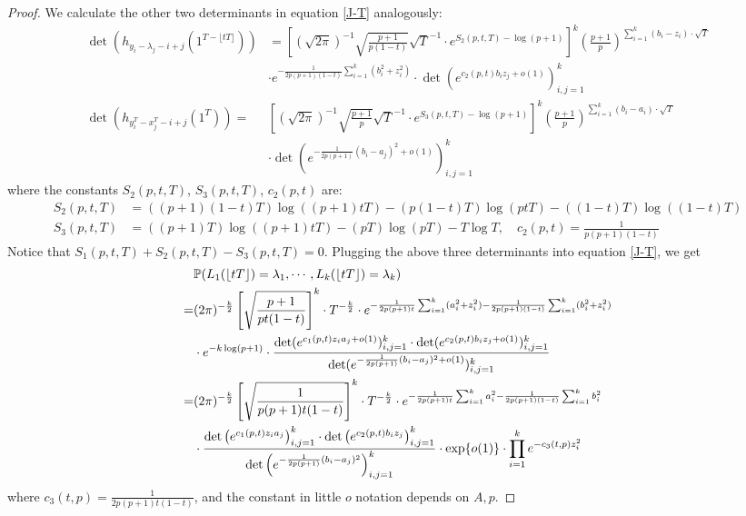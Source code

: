\begin{proof}
We calculate the other two determinants in equation \ref{J-T} analogously:
\begin{align*}
	\det \left(h_{y_{i}-\lambda_{j}-i+j}(1^{T-\lfloor tT \rfloor})\right)&= \left[(\sqrt{2\pi})^{-1}\sqrt{\frac{p+1}{p(1-t)}}\sqrt{T}^{-1}\cdot e^{S_{2}(p,t,T)-\log(p+1)}\right]^{k}\left(\frac{p+1}{p}\right)^{\sum_{i=1}^{k}(b_{i}-z_{i})\cdot\sqrt{T}} \\
	& \cdot e^{-\frac{1}{2p(p+1)(1-t)}\sum_{i=1}^{k}(b_{i}^2+z_{i}^2)}\cdot \det\left(e^{c_{2}(p,t)b_{i}z_{j}+o(1)}\right)_{i,j=1}^{k}\\
	\det(h_{y_{i}^{T}-x_{j}^{T}-i+j}(1^{T}))=& \left[(\sqrt{2\pi})^{-1}\sqrt{\frac{p+1}{p}}\sqrt{T}^{-1}\cdot e^{S_{3}(p,t,T)-\log(p+1)}\right]^{k}\left(\frac{p+1}{p}\right)^{\sum_{i=1}^{k}(b_{i}-a_{i})\cdot\sqrt{T}} \\
	&\cdot \det\left(e^{-\frac{1}{2p(p+1)}(b_{i}-a_{j})^2+o(1)}\right)_{i,j=1}^{k}
	\end{align*}
where the constants $S_{2}(p,t,T)$, $S_{3}(p,t,T)$, $c_{2}(p,t)$ are:
\begin{align*}
S_{2}(p,t,T)&=((p+1)(1-t)T)\log((p+1)tT)-(p(1-t)T)\log(ptT)-((1-t)T)\log((1-t)T)\\ 
S_{3}(p,t,T)&=((p+1)T)\log((p+1)tT)-(pT)\log(pT)-T\log T,\quad c_{2}(p,t)=\frac{1}{p(p+1)(1-t)}\end{align*}
Notice that $S_{1}(p,t,T)+S_{2}(p,t,T)-S_{3}(p,t,T)=0$. Plugging the above three determinants into equation \ref{J-T}, we get
\begin{equation}{\label{PointConv}}
\begin{split}
	& \mathbb{P}(L_1(\lfloor tT\rfloor)=\lambda_1,\cdots, L_k(\lfloor tT\rfloor)=\lambda_k)\\
	= & (2\pi)^{-\frac{k}{2}}\left[\sqrt{\frac{p+1}{pt(1-t)}}\right]^{k}\cdot T^{-\frac{k}{2}} \cdot e^{-\frac{1}{2p(p+1)t}\sum_{i=1}^{k}(a_{i}^2+z_{i}^2)-\frac{1}{2p(p+1)(1-t)}\sum_{i=1}^{k}(b_{i}^2+z_{i}^{2})}\\
	& \cdot e^{-k\log(p+1)}\cdot \frac{\det(e^{c_{1}(p,t)z_{i}a_{j}+o(1)})_{i,j=1}^{k}\cdot \det(e^{c_{2}(p,t)b_{i}z_{j}+o(1)})_{i,j=1}^{k}}{\det(e^{-\frac{1}{2p(p+1)}(b_{i}-a_{j})^{2}+o(1)})_{i,j=1}^{k}}\\
	= &(2\pi)^{-\frac{k}{2}}\left[\sqrt{\frac{1}{p(p+1)t(1-t)}}\right]^{k}\cdot T^{-\frac{k}{2}}\cdot e^{-\frac{1}{2p(p+1)t}\sum_{i=1}^{k}a_{i}^2-\frac{1}{2p(p+1)(1-t)}\sum_{i=1}^{k}b_{i}^2}\\
	& \cdot\frac{\det\left(e^{c_{1}(p,t)z_{i}a_{j}}\right)_{i,j=1}^{k}\cdot \det\left(e^{c_{2}(p,t)b_{i}z_{j}}\right)_{i,j=1}^{k}}{\det\left(e^{-\frac{1}{2p(p+1)}(b_{i}-a_{j})^{2}}\right)_{i,j=1}^{k}}\cdot \exp\{o(1)\}\cdot \prod_{i=1}^{k}e^{-c_{3}(t,p)z_{i}^2}
\end{split}
\end{equation}
where $c_{3}(t,p)=\frac{1}{2p(p+1)t(1-t)}$, and the constant in little $o$ notation depends on $A,p$.


\end{proof}

